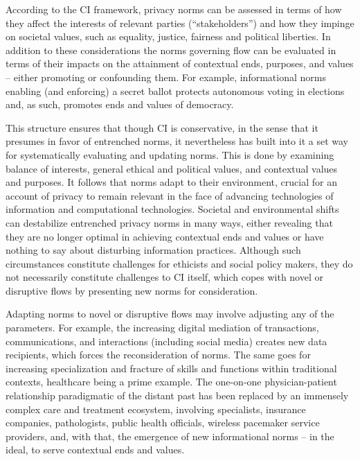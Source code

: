 \documentclass[../thesis.tex]{subfiles}
\begin{document}
\bigskip

According to the CI framework, privacy norms can be assessed in terms of
how they affect the interests of relevant parties
(``stakeholders'') and how they
impinge on societal values, such as equality, justice, fairness and
political liberties. In addition to these considerations the norms
governing flow can be evaluated in terms of their impacts on the
attainment of contextual ends, purposes, and values -- either promoting
or confounding them. For example, informational norms enabling (and
enforcing) a secret ballot protects autonomous voting in elections and,
as such, promotes ends and values of democracy.


\bigskip

This structure ensures that though CI is conservative, in the sense that
it presumes in favor of entrenched norms, it nevertheless has built
into it a set way for systematically evaluating and updating norms.
This is done by examining balance of interests, general ethical and
political values, and contextual values and purposes. It follows that
norms adapt to their environment, crucial for an account of privacy to
remain relevant in the face of advancing technologies of information
and computational technologies. Societal and environmental shifts can
destabilize entrenched privacy norms in many ways, either revealing
that they are no longer optimal in achieving contextual ends and values
or have nothing to say about disturbing information practices. Although
such circumstances constitute challenges for ethicists and social
policy makers, they do not necessarily constitute challenges to CI
itself, which copes with novel or disruptive flows by presenting new
norms for consideration.


\bigskip

Adapting norms to novel or disruptive flows may involve adjusting any of
the parameters. For example, the increasing digital mediation of
transactions, communications, and interactions (including social media)
creates new data recipients, which forces the reconsideration of norms.
The same goes for increasing specialization and fracture of skills and
functions within traditional contexts, healthcare being a prime
example. The one-on-one physician-patient relationship paradigmatic of
the distant past has been replaced by an immensely complex care and
treatment ecosystem, involving specialists, insurance companies,
pathologists, public health officials, wireless pacemaker service
providers, and, with that, the emergence of new informational norms --
in the ideal, to serve contextual ends and values.
\end{document}
